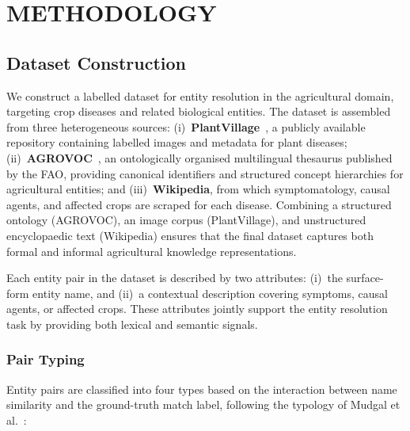 \section{METHODOLOGY}
\label{sec:method}

\subsection{Dataset Construction}
\label{sec:dataset}

We construct a labelled dataset for entity resolution in the agricultural
domain, targeting crop diseases and related biological entities.
The dataset is assembled from three heterogeneous sources:
(i)~\textbf{PlantVillage}~\cite{plantvillage}, a publicly available
repository containing labelled images and metadata for plant diseases;
(ii)~\textbf{AGROVOC}~\cite{agrovoc}, an ontologically organised
multilingual thesaurus published by the FAO, providing canonical
identifiers and structured concept hierarchies for agricultural entities;
and (iii)~\textbf{Wikipedia}, from which symptomatology, causal agents,
and affected crops are scraped for each disease.
Combining a structured ontology (AGROVOC), an image corpus
(PlantVillage), and unstructured encyclopaedic text (Wikipedia) ensures
that the final dataset captures both formal and informal agricultural
knowledge representations.

Each entity pair in the dataset is described by two attributes:
(i)~the surface-form entity name, and (ii)~a contextual description
covering symptoms, causal agents, or affected crops. These attributes
jointly support the entity resolution task by providing both lexical and
semantic signals.

\subsubsection{Pair Typing}
\label{sec:pair_types}

Entity pairs are classified into four types based on the interaction
between name similarity and the ground-truth match label, following the
typology of Mudgal et al.~\cite{mudgal2018deep}:

